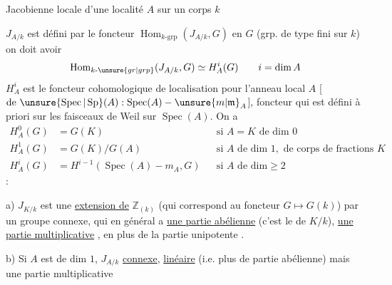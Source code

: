Jacobienne locale  d'une localité  $A$ sur un corps $k$

$J_{A/k}$ est défini par le foncteur $\operatorname{Hom}_{k\text{-grp}}(J_{A/k},G)$ en $G$ (grp.  de type fini sur $k$) on doit avoir
\[
\operatorname{Hom}_{k\text{-}\unsure{gr|grp}}(J_{A/k},G)\simeq H_A^i(G)\qquad i=\dim A
\]
$H_A^i$ est le foncteur cohomologique de localisation pour l'anneau local $A$ [$\text{de }\unsure{\operatorname{Spec}|\operatorname{Sp}}(A):\operatorname{Spec}(A)-{\unsure{m|\mathfrak m}}_A$], foncteur qui est défini à priori sur les faisceaux de Weil sur $\operatorname{Spec}(A)$. On a
\[
\begin{aligned}
H_A^0(G)&=G(K)&&\text{si }A=K\text{ de dim }0\\
H_A^1(G)&=G(K)/G(A)&&\text{si }A\text{ de dim }1,\text{ de corps de fractions }K\\
H_A^i(G)&=H^{i-1}(\operatorname{Spec}(A)-m_A,G)&&\text{si }A\text{ de dim}\geq2
\end{aligned}
\]
 :

\noindent a) $J_{K/k}$ est une \uline{extension de} $\mathbb Z_{(k)}$ (qui correspond au foncteur $G\longmapsto G(k)$) par un groupe connexe, qui en général a \uline{une partie abélienne} (c'est le  de $K/k$), \uline{une partie multiplicative} , en plus de la partie unipotente .

\noindent b) Si $A$ est de dim $1$, $J_{A/k}$ \uline{connexe}, \uline{linéaire} (i.e. plus de partie abélienne) mais   une  partie multiplicative 
